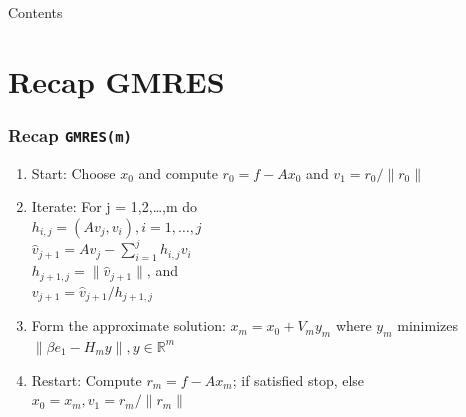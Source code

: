 

\subject{Pseudospektren}





\begin{frame}\titlepage
\end{frame}

\begin{frame}{Contents}
  \tableofcontents[hideallsubsections]
\end{frame}

\section{Recap GMRES}
\begin{frame}
\frametitle{Recap \texttt{GMRES(m)}}
  \begin{enumerate}
  \item Start: Choose $x_0$ and compute $r_0 = f - Ax_0$ and $v_1 = r_0/\|r_0\|$ 
  \item Iterate: For j = 1,2,\dots,m do \\
        $h_{i,j} = (Av_j,v_i), i = 1,\dots,j $\\
        $\hat{v}_{j+1} = Av_j  - \sum_{i=1}^{j} h_{i,j}v_{i}$ \\
        $h_{j+1,j} = \| \hat{v}_{j+1} \| $, and \\
        $v_{j+1} =  \hat{v}_{j+1} / {h}_{j+1,j} $ \\
  \item Form the approximate solution:
        $x_m = x_0 + V_m y_m$ where $y_m$ minimizes $\| \beta e_1 - H_m y \|, y\in \mathbb{R}^m$
  \item Restart:
        Compute $r_m = f - Ax_m$; if satisfied stop, else
        $x_0 = x_m, v_1 = r_m/\|r_m\|$
  
  \end{enumerate}
  
  
\end{frame}


